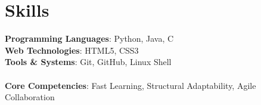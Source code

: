 \documentclass[A4,11pt]{article}
\begin{document}
\section{Skills}
\vspace{4pt}
 \begin{itemize}[leftmargin=0.5cm, label={}]
    \small{\item{
     \textbf{Programming Languages}{: Python, Java, C} \\ \vspace{4pt}
     \textbf{Web Technologies}{: HTML5, CSS3} \\ \vspace{4pt}
     \textbf{Tools \& Systems}{: Git, GitHub, Linux Shell} \\ \vspace{4pt}
     \\ \vspace{4pt}
     \textbf{Core Competencies}{: Fast Learning, Structural Adaptability, Agile Collaboration}
    }}
 \end{itemize}
    
\end{document}
